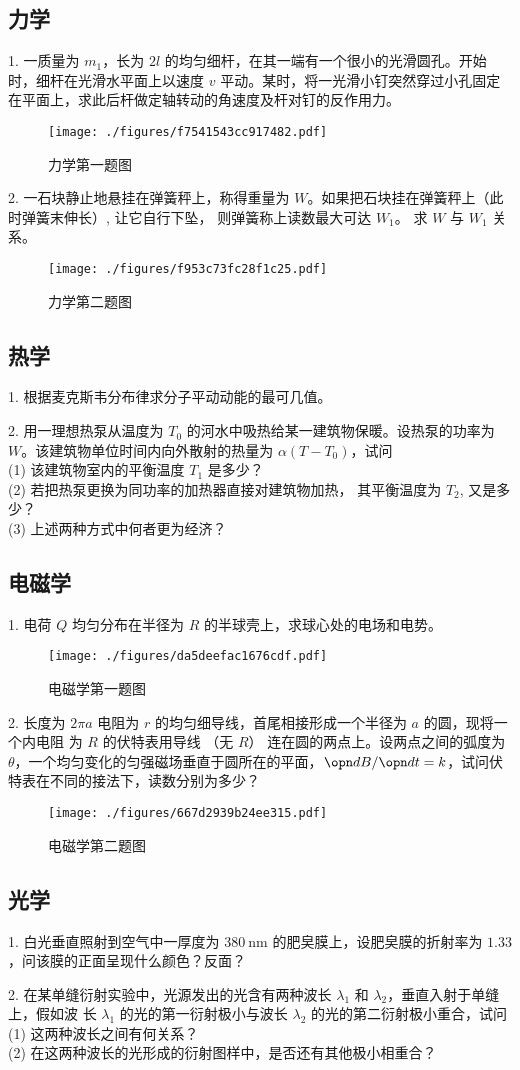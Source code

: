 \subsection{力学}
1. 一质量为 $m_{1}$，长为 $2l$ 的均匀细杆，在其一端有一个很小的光滑圆孔。开始时，细杆在光滑水平面上以速度 $v$ 平动。某时，将一光滑小钉突然穿过小孔固定在平面上，求此后杆做定轴转动的角速度及杆对钉的反作用力。
\begin{figure}[ht]
\centering
\texttt{[image: ./figures/f7541543cc917482.pdf]}
\caption{力学第一题图} \label{fig_NJU14_1}
\end{figure}
2. 一石块静止地悬挂在弹簧秤上，称得重量为 $W$。如果把石块挂在弹簧秤上（此时弹簧末伸长）, 让它自行下坠， 则弹簧称上读数最大可达 $W_{1}$。 求 $W$ 与 $W_{1}$ 关系。
\begin{figure}[ht]
\centering
\texttt{[image: ./figures/f953c73fc28f1c25.pdf]}
\caption{力学第二题图} \label{fig_NJU14_2}
\end{figure}
\subsection{热学}
1. 根据麦克斯韦分布律求分子平动动能的最可几值。

2. 用一理想热泵从温度为 $T_{0}$ 的河水中吸热给某一建筑物保暖。设热泵的功率为 $W$。该建筑物单位时间内向外散射的热量为 $\alpha\left(T-T_{0}\right)$，试问\\
(1) 该建筑物室内的平衡温度 $T_{1}$ 是多少？\\
(2) 若把热泵更换为同功率的加热器直接对建筑物加热， 其平衡温度为 $T_{2}$, 又是多少？\\
(3) 上述两种方式中何者更为经济？\\
\subsection{电磁学}
1. 电荷 $Q$ 均匀分布在半径为 $R$ 的半球壳上，求球心处的电场和电势。
\begin{figure}[ht]
\centering
\texttt{[image: ./figures/da5deefac1676cdf.pdf]}
\caption{电磁学第一题图} \label{fig_NJU14_4}
\end{figure}
2. 长度为 $2 \pi a$ 电阻为 $r$ 的均匀细导线，首尾相接形成一个半径为 $a$ 的圆，现将一个内电阻 为 $R$ 的伏特表用导线 （无 $R$） 连在圆的两点上。设两点之间的弧度为 $\theta$，一个均匀变化的匀强磁场垂直于圆所在的平面，$\opn dB/\opn dt =k$，试问伏特表在不同的接法下，读数分别为多少？
\begin{figure}[ht]
\centering
\texttt{[image: ./figures/667d2939b24ee315.pdf]}
\caption{电磁学第二题图} \label{fig_NJU14_3}
\end{figure}
\subsection{光学}
1. 白光垂直照射到空气中一厚度为 $380 \mathrm{~nm}$ 的肥㚖膜上，设肥㚖膜的折射率为 $1.33$，问该膜的正面呈现什么颜色？反面？

2. 在某单缝衍射实验中，光源发出的光含有两种波长 $\lambda_{1}$ 和 $\lambda_{2}$，垂直入射于单缝上，假如波 长 $\lambda_{1}$ 的光的第一衍射极小与波长 $\lambda_{2}$ 的光的第二衍射极小重合，试问\\
(1) 这两种波长之间有何关系？\\
(2) 在这两种波长的光形成的衍射图样中，是否还有其他极小相重合？